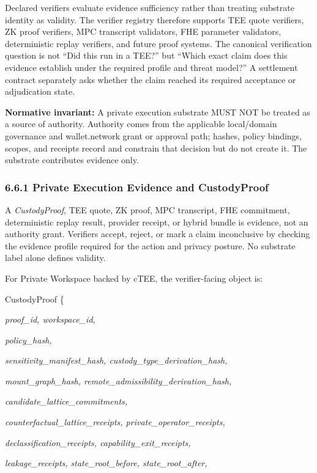 \documentclass[
  11pt,
]{article}
\begin{document}
Declared verifiers evaluate evidence sufficiency rather than treating
substrate identity as validity. The verifier registry therefore supports TEE quote verifiers,
ZK proof verifiers, MPC transcript validators, FHE parameter validators,
deterministic replay verifiers, and future proof systems. The canonical
verification question is not ``Did this run in a TEE?'' but ``Which exact
claim does this evidence establish under the required profile and threat
model?'' A settlement contract separately asks whether the claim reached its
required acceptance or adjudication state.

\textbf{Normative invariant:} A private execution substrate MUST NOT be
treated as a source of authority. Authority comes from the applicable
local/domain governance and wallet.network grant or approval path; hashes,
policy bindings, scopes, and receipts record and constrain that decision but
do not create it. The substrate contributes evidence only.

\hypertarget{the-privateexecutionenvelopereceipt}{%
\subsubsection{6.6.1 Private Execution Evidence and
CustodyProof}\label{the-privateexecutionenvelopereceipt}}

A \emph{CustodyProof}, TEE quote, ZK proof, MPC transcript, FHE
commitment, deterministic replay result, provider receipt, or hybrid bundle
is evidence, not an authority grant. Verifiers accept, reject, or mark a claim
inconclusive by checking the evidence profile required for the action and
privacy posture. No substrate label alone defines validity.

For Private Workspace backed by cTEE, the verifier-facing object is:

CustodyProof \{

\emph{proof\_id, workspace\_id,}

\emph{policy\_hash,}

\emph{sensitivity\_manifest\_hash, custody\_type\_derivation\_hash,}

\emph{mount\_graph\_hash, remote\_admissibility\_derivation\_hash,}

\emph{candidate\_lattice\_commitments,}

\emph{counterfactual\_lattice\_receipts, private\_operator\_receipts,}

\emph{declassification\_receipts, capability\_exit\_receipts,}

\emph{leakage\_receipts, state\_root\_before, state\_root\_after,}
\end{document}
